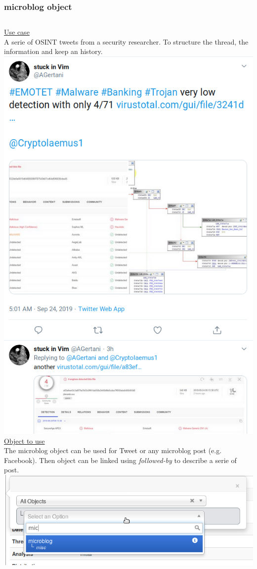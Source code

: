 \begin{frame}
\frametitle{microblog object}
\begin{columns}[totalwidth=\textwidth]
        \underline{Use case}\\
A serie of OSINT tweets from a security researcher.
To structure the thread, the information
and keep an history.\\
        \includegraphics[scale=0.15]{emotet.png}
        \underline{Object to use}\\
        The microblog object can be used for Tweet or any microblog post (e.g. Facebook). Then object can be linked using {\it followed-by} to describe a serie of post.\\
        \includegraphics[scale=0.15]{microblog.png}
\end{columns}
\end{frame}

